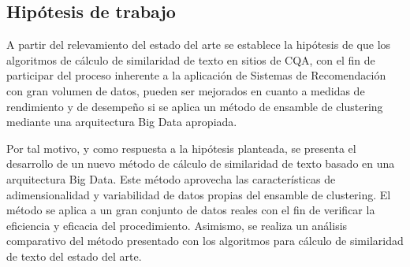 \subsection{Hipótesis de trabajo}
A partir del relevamiento del estado del arte se establece la hipótesis de que los algoritmos de cálculo de similaridad de texto en sitios de CQA, con el fin de participar del proceso inherente a la aplicación de Sistemas de Recomendación con gran volumen de datos, pueden ser mejorados en cuanto a medidas de rendimiento y de desempeño si se aplica un método de ensamble de clustering mediante una arquitectura Big Data apropiada.

\bigskip Por tal motivo, y como respuesta a la hipótesis planteada, se presenta el desarrollo de un nuevo método de cálculo de similaridad de texto basado en una arquitectura Big Data. Este método aprovecha las características de adimensionalidad y variabilidad de datos propias del ensamble de clustering. El método se aplica a un gran conjunto de datos reales con el fin de verificar la eficiencia y eficacia del procedimiento. Asimismo, se realiza un análisis comparativo del método presentado con los algoritmos para cálculo de similaridad de texto del estado del arte.